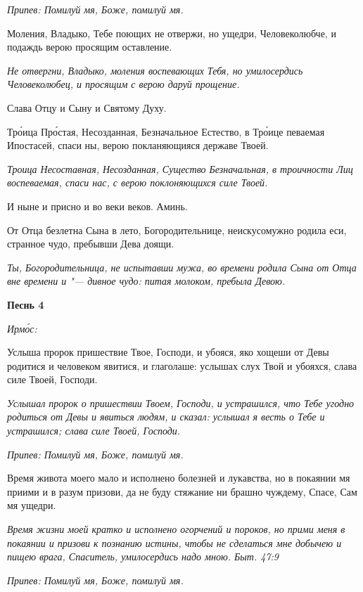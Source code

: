 \itshape Припев:\normalfont{} Помилуй мя, Боже, помилуй мя.


Моления, Владыко, Тебе поющих не отвержи, но ущедри, Человеколюбче, и подаждь верою просящим оставление.


\itshape Не отвергни, Владыко, моления воспевающих Тебя, но умилосердись Человеколюбец, и просящим с верою даруй прощение.\normalfont{}


Слава Отцу и Сыну и Святому Духу.


Тро́ица Про́стая, Несозданная, Безначальное Естество, в Тро́ице певаемая Ипостасей, спаси ны, верою покланяющияся державе Твоей.


\itshape Троица Несоставная, Несозданная, Существо Безначальная, в троичности Лиц воспеваемая, спаси нас, с верою поклоняющихся силе Твоей.\normalfont{}


И ныне и присно и во веки веков. Аминь.


От Отца безлетна Сына в лето, Богородительнице, неискусомужно родила еси, странное чудо, пребывши Дева доящи.


\itshape Ты, Богородительница, не испытавши мужа, во времени родила Сына от Отца вне времени и "--- дивное чудо: питая молоком, пребыла Девою.\normalfont{}





\bfseries Песнь 4\normalfont{}


\itshape Ирмо́с:\normalfont{}


Услыша пророк пришествие Твое, Господи, и убояся, яко хощеши от Девы родитися и человеком явитися, и глаголаше: услышах слух Твой и убояхся, слава силе Твоей, Господи.


\itshape Услышал пророк о пришествии Твоем, Господи, и устрашился, что Тебе угодно родиться от Девы и явиться людям, и сказал: услышал я весть о Тебе и устрашился; слава силе Твоей, Господи.\normalfont{}


\itshape Припев:\normalfont{} Помилуй мя, Боже, помилуй мя.


Время живота моего мало и исполнено болезней и лукавства, но в покаянии мя приими и в разум призови, да не буду стяжание ни брашно чуждему, Спасе, Сам мя ущедри.


\itshape Время жизни моей кратко и исполнено огорчений и пороков, но прими меня в покаянии и призови к познанию истины, чтобы не сделаться мне добычею и пищею врага, Спаситель, умилосердись надо мною. Быт. 47:9\normalfont{}


\itshape Припев:\normalfont{} Помилуй мя, Боже, помилуй мя.


